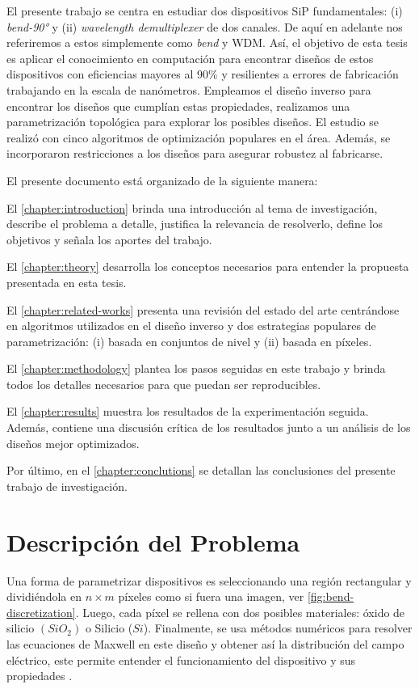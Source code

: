 El presente trabajo se centra en estudiar dos dispositivos SiP
fundamentales:
(i) \emph{bend-90°} y (ii) \emph{wavelength demultiplexer} de dos canales.
De aquí en adelante nos referiremos a estos simplemente como \emph{bend} y WDM.
Así, el objetivo de esta tesis es aplicar el conocimiento en computación para
encontrar diseños de estos dispositivos con eficiencias mayores al 90\%
y resilientes a errores de fabricación trabajando en la escala de nanómetros.
Empleamos el diseño inverso para encontrar los diseños que cumplían estas propiedades,
realizamos una parametrización topológica para explorar los posibles diseños.
El estudio se realizó con cinco algoritmos de optimización populares en el área.
Además, se incorporaron restricciones a los diseños para asegurar robustez al fabricarse.

El presente documento está organizado de la siguiente manera:

El \autoref{chapter:introduction}  brinda una introducción al tema de investigación, describe el problema a detalle, justifica la relevancia de resolverlo, define los objetivos y señala los aportes del trabajo.

El \autoref{chapter:theory} desarrolla los conceptos necesarios para entender la propuesta presentada
en esta tesis.

El \autoref{chapter:related-works} presenta una revisión del estado del arte centrándose
en algoritmos utilizados en el diseño inverso y dos estrategias populares de parametrización:
(i) basada en conjuntos de nivel y (ii) basada en píxeles.

El \autoref{chapter:methodology} plantea los pasos seguidas en este trabajo y brinda
todos los detalles necesarios para que puedan ser reproducibles.

El \autoref{chapter:results} muestra los resultados de la experimentación seguida.
Además, contiene una discusión crítica de los resultados junto a un análisis de los
diseños mejor optimizados.

Por último, en el \autoref{chapter:conclutions} se detallan las conclusiones del presente trabajo de investigación.

\section{Descripción del Problema}

Una forma de parametrizar dispositivos es seleccionando una región rectangular y dividiéndola
en $n \times m$ píxeles como si fuera una imagen, ver \autoref{fig:bend-discretization}.
Luego, cada píxel se rellena con dos posibles materiales: óxido de silicio $(SiO_2)$ o Silicio ($Si$).
Finalmente, se usa métodos numéricos para resolver las ecuaciones de Maxwell en este diseño
y obtener así la distribución del campo eléctrico, este permite entender el funcionamiento del dispositivo
y sus propiedades \citep{Molesky2018, Schneider2019}.

